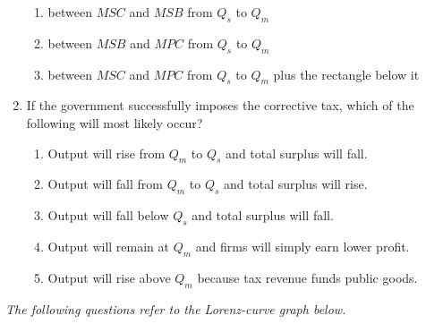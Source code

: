 \documentclass[10pt]{article}
\newenvironment{choiceslist}
  {\begin{enumerate}[label=(\Alph*), leftmargin=1.55em, itemsep=0.1em, topsep=0.15em, parsep=0pt]}
  {\end{enumerate}}
\newenvironment{stimulus}
  {\begin{center}\begin{minipage}{0.97\columnwidth}\footnotesize\itshape\setlength{\tabcolsep}{3pt}\renewcommand{\arraystretch}{0.96}}
  {\end{minipage}\end{center}}
\begin{document}
\begin{multicols*}{2}
\begin{enumerate}[resume*=curveq, leftmargin=*, itemsep=0.8em, topsep=0.18em, parsep=0pt]
\begin{choiceslist}
\item between $MSC$ and $MSB$ from $Q_s$ to $Q_m$
\item between $MSB$ and $MPC$ from $Q_s$ to $Q_m$
\item between $MSC$ and $MPC$ from $Q_s$ to $Q_m$ plus the rectangle below it
\end{choiceslist}
\item If the government successfully imposes the corrective tax, which of the following will most likely occur?
\begin{choiceslist}
\item Output will rise from $Q_m$ to $Q_s$ and total surplus will fall.
\item Output will fall from $Q_m$ to $Q_s$ and total surplus will rise.
\item Output will fall below $Q_s$ and total surplus will fall.
\item Output will remain at $Q_m$ and firms will simply earn lower profit.
\item Output will rise above $Q_m$ because tax revenue funds public goods.
\end{choiceslist}
\end{enumerate}
\begin{stimulus}
The following questions refer to the Lorenz-curve graph below.


\end{stimulus}
\end{multicols*}
\end{document}
